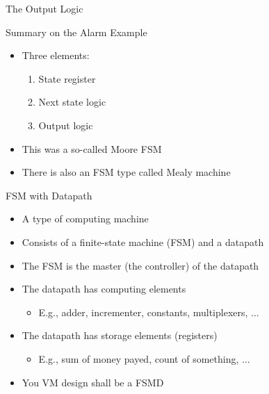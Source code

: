 \begin{frame}[fragile]{The Output Logic}
\end{frame}

\begin{frame}[fragile]{Summary on the Alarm Example}
\begin{itemize}
\item Three elements:
\begin{enumerate}
\item State register
\item Next state logic
\item Output logic
\end{enumerate}
\item This was a so-called Moore FSM
\item There is also an FSM type called Mealy machine
\end{itemize}
\end{frame}


\begin{frame}[fragile]{FSM with Datapath}
\begin{itemize}
\item A type of computing machine
\item Consists of a finite-state machine (FSM) and a datapath
\item The FSM is the master (the controller) of the datapath
\item The datapath has computing elements
\begin{itemize}
\item E.g., adder, incrementer, constants, multiplexers, ...
\end{itemize}
\item The datapath has storage elements (registers)
\begin{itemize}
\item E.g., sum of money payed, count of something, ...
\end{itemize}
\item You VM design shall be a FSMD
\end{itemize}
\end{frame}

